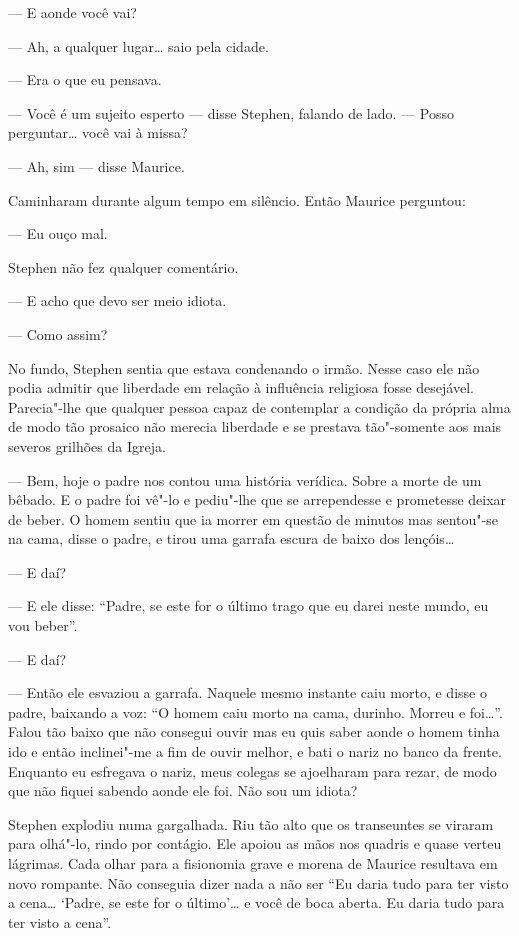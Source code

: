 --- E aonde você vai?

--- Ah, a qualquer lugar\ldots{} saio pela cidade.

--- Era o que eu pensava.

--- Você é um sujeito esperto --- disse Stephen, falando de lado.
--- Posso perguntar\ldots{} você vai à missa?

--- Ah, sim --- disse Maurice.

Caminharam durante algum tempo em silêncio.  Então Maurice
perguntou:

--- Eu ouço mal.

Stephen não fez qualquer comentário.

--- E acho que devo ser meio idiota.

--- Como assim?

No fundo, Stephen sentia que estava condenando o irmão.  Nesse caso
ele não podia admitir que liberdade em relação à influência religiosa
fosse desejável.  Parecia"-lhe que qualquer pessoa capaz de contemplar a
condição da própria alma de modo tão prosaico não merecia liberdade e
se prestava tão"-somente aos mais severos \label{grilhoes"-da} grilhões da Igreja.

--- Bem, hoje o padre nos contou uma história verídica.  Sobre a
morte de um bêbado.  E o padre foi vê"-lo e pediu"-lhe que se
arrependesse e prometesse deixar de beber.  O homem sentiu que ia
morrer em questão de minutos mas sentou"-se na cama, disse o padre, e
tirou uma garrafa escura de baixo dos lençóis\ldots{}

--- E daí?

--- E ele disse: “Padre, se este for o último trago que eu darei
neste mundo, eu vou beber”.

--- E daí?

--- Então ele esvaziou a garrafa.  Naquele mesmo instante caiu
morto, e disse o padre, baixando a voz: “O homem caiu morto na cama,
durinho.  Morreu e foi\ldots{}”.  Falou tão baixo que não consegui ouvir mas
eu quis saber aonde o homem tinha ido e então inclinei"-me
a fim de ouvir melhor, e bati o nariz no banco da frente.
Enquanto eu esfregava o nariz, meus colegas se ajoelharam para
rezar, de modo que não fiquei sabendo aonde ele foi.  Não sou um
idiota?

Stephen explodiu numa gargalhada.  Riu tão alto que os transeuntes
se viraram para olhá"-lo, rindo por contágio.  Ele apoiou as mãos nos
quadris e quase verteu lágrimas.  Cada olhar para a fisionomia grave e
morena de Maurice resultava em novo rompante.  Não conseguia dizer nada
a não ser “Eu daria tudo para ter visto a cena\ldots{} ‘Padre, se este for o
último’\ldots{} e você de boca aberta.  Eu daria tudo para ter visto a
cena”.

